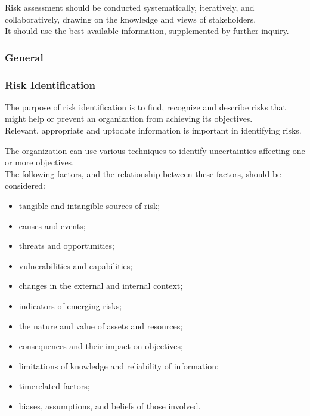 \documentclass[letterpaper,10pt,english]{jupyterBook}
\begin{document}
\sphinxAtStartPar
Risk assessment should be conducted systematically, iteratively, and collaboratively, drawing on the knowledge and views of stakeholders. \\
It should use the best available information, supplemented by further inquiry.


\subsubsection{General}
\label{\detokenize{PM/rm:id2}}

\subsubsection{Risk Identification}
\label{\detokenize{PM/rm:risk-identification}}
\sphinxAtStartPar
The purpose of risk identification is to find, recognize and describe risks that might help or prevent an organization from achieving its objectives. \\
Relevant, appropriate and up\sphinxhyphen{}to\sphinxhyphen{}date information is important in identifying risks.

\sphinxAtStartPar
The organization can use various techniques to identify uncertainties affecting one or more objectives. \\
The following factors, and the relationship between these factors, should be considered:
\begin{itemize}
\item {} 
\sphinxAtStartPar
tangible and intangible sources of risk;

\item {} 
\sphinxAtStartPar
causes and events;

\item {} 
\sphinxAtStartPar
threats and opportunities;

\item {} 
\sphinxAtStartPar
vulnerabilities and capabilities;

\item {} 
\sphinxAtStartPar
changes in the external and internal context;

\item {} 
\sphinxAtStartPar
indicators of emerging risks;

\item {} 
\sphinxAtStartPar
the nature and value of assets and resources;

\item {} 
\sphinxAtStartPar
consequences and their impact on objectives;

\item {} 
\sphinxAtStartPar
limitations of knowledge and reliability of information;

\item {} 
\sphinxAtStartPar
time\sphinxhyphen{}related factors;

\item {} 
\sphinxAtStartPar
biases, assumptions, and beliefs of those involved.

\end{itemize}
\end{document}
